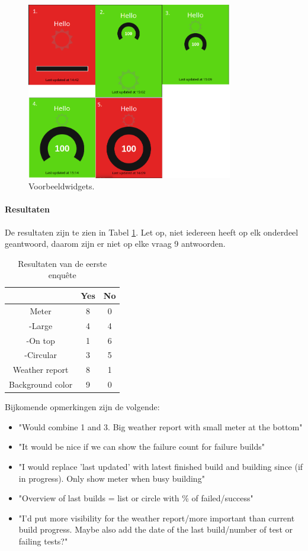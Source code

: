 \documentclass[10pt,a4paper]{article}
\begin{document}
\begin{appendices}
\begin{figure}[ht!]
\centering
\includegraphics[width=90mm]{proposals.png}
\caption{Voorbeeldwidgets.} 
\label{proposals}
\end{figure} 

\paragraph{Resultaten}
De resultaten zijn te zien in Tabel \ref{results}. Let op, niet iedereen heeft op elk onderdeel geantwoord, daarom zijn er niet op elke vraag 9 antwoorden.

\begin{table}[h!]
\centering
\begin{tabular}{|c|c|c|}
\hline                         										
		 			&	Yes 		&	No		\\	\hline	\hline
Meter				&	8			&	0		\\	\hline
-Large				&	4			&	4		\\	\hline
-On top				&	1			&	6		\\	\hline	
-Circular			&	3			&	5		\\	\hline
Weather report		&	8			&	1		\\	\hline
Background color	&	9			&	0		\\	\hline
\end{tabular}
\caption{Resultaten van de eerste enqu\^ete}
\label{results}
\end{table}

Bijkomende opmerkingen zijn de volgende:
\begin{itemize}
\item "Would combine 1 and 3. Big weather report with small meter at the bottom"
\item "It would be nice if we can show the failure count for failure builds"
\item "I would replace 'last updated' with latest finished build and building since (if in progress). Only show meter when busy building"
\item "Overview of last builds = list or circle with \% of failed/success"
\item "I'd put more visibility for the weather report/more important than current build progress. Maybe also add the date of the last build/number of test or failing tests?"
\end{itemize}


\end{appendices}
\end{document}
